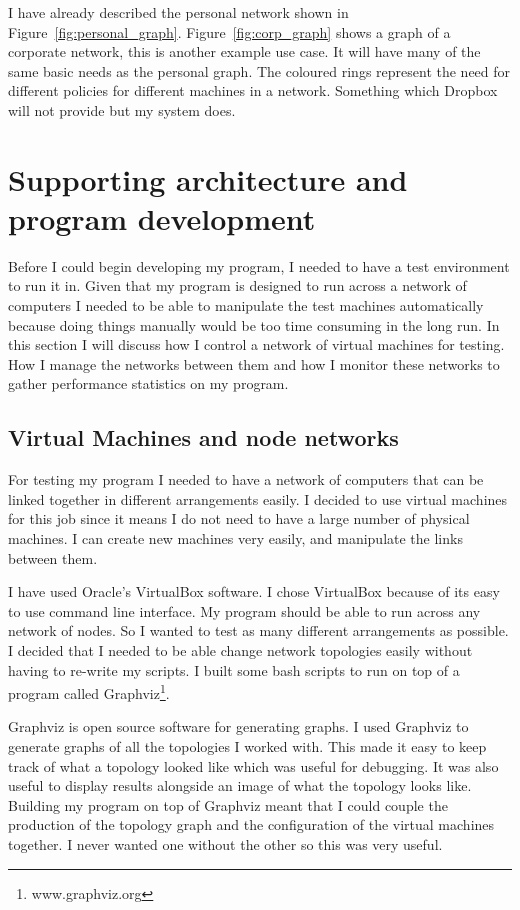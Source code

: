 \documentclass[12pt]{article}
\begin{document}
I have already described the personal network shown in
Figure~\ref{fig:personal_graph}. Figure~\ref{fig:corp_graph}
shows a graph of a corporate network, this
is another example use case. It will have many of the same
basic needs as the personal graph. The coloured rings represent
the need for different policies for different machines in a network.
Something which Dropbox will not provide but my system does.


\newpage
\section{Supporting architecture and program development}
Before I could begin developing my program, I needed to
have a test environment to run it in. Given that my program
is designed to run across a network of computers I needed
to be able to manipulate the test machines automatically
because doing things manually would be too time consuming
in the long run. In this section I will discuss how I
control a network of virtual machines for testing. How
I manage the networks between them and how I monitor
these networks to gather performance statistics on
my program.

\subsection{Virtual Machines and node networks}
\label{sec:vm_network}
For testing my program I needed to have a network
of computers that can be linked together in different
arrangements easily. I decided to use virtual machines for
this job since it means I do not need to have a large number
of physical machines. I can create new machines very easily,
and manipulate the links between them.

I have used Oracle's VirtualBox software. I chose
VirtualBox because of its easy to use command
line interface.
My program should be able to run across
any network of nodes. So I wanted to test
as many different arrangements as possible.
I decided that I needed to be able change network
topologies easily without having to re-write
my scripts. I built some bash scripts to run on top
of a program called Graphviz\footnote{www.graphviz.org}.

Graphviz is open source software for generating graphs.
I used Graphviz to generate graphs of all the topologies I worked
with. This made it easy to keep track of what a topology looked like
which was useful for debugging. It was also useful to display results
alongside an image of what the topology looks like. Building my
program on top of Graphviz meant that I could couple the production
of the topology graph and the configuration of the virtual machines
together. I never wanted one without the other so this was very useful.
\end{document}
